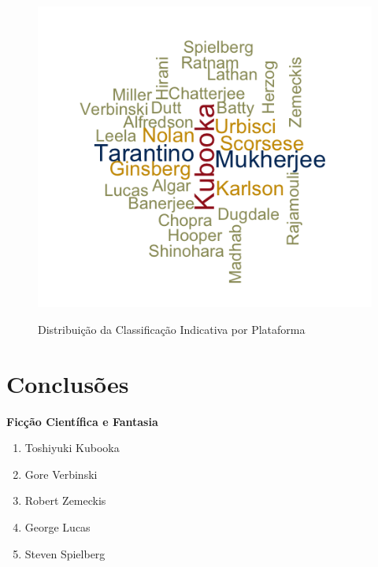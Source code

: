 \documentclass[a4paper, 12pt]{article} %
\begin{document}
\begin{figure}[H]
    \centering
    \caption{Distribuição da Classificação Indicativa por Plataforma}
    \includegraphics[scale=0.25]{Nuvem.png}
    \label{fig:my_label}
\end{figure}

\section{Conclusões}
\textbf{Ficção Científica e Fantasia}
\begin{enumerate}[topsep=0pt,partopsep=0pt]
    \item Toshiyuki Kubooka
    \item Gore Verbinski
    \item Robert Zemeckis
    \item George Lucas
    \item Steven Spielberg
\end{enumerate}
\end{document}
